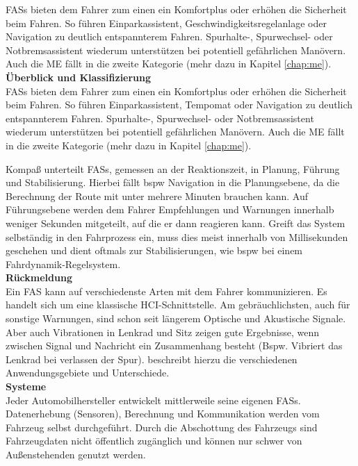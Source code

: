 {\acl{FASs} bieten dem Fahrer zum einen ein Komfortplus oder erhöhen die Sicherheit beim Fahren. So führen Einparkassistent,  Geschwindigkeitsregelanlage oder Navigation zu deutlich entspannterem Fahren. Spurhalte-, Spurwechsel- oder Notbremsassistent wiederum unterstützen bei potentiell gefährlichen Manövern. Auch die \acl{ME} fällt in die zweite Kategorie (mehr dazu in Kapitel \ref{chap:me}).\\

\textbf{Überblick und Klassifizierung} \\
\acl{FASs} bieten dem Fahrer zum einen ein Komfortplus oder erhöhen die Sicherheit beim Fahren. So führen Einparkassistent, Tempomat oder Navigation zu deutlich entspannterem Fahren. 
Spurhalte-, Spurwechsel- oder Notbremsassistent wiederum unterstützen bei potentiell gefährlichen Manövern. Auch die \acl{ME} fällt in die zweite Kategorie (mehr dazu in Kapitel \ref{chap:me}).

Kompaß \cite{fasFuture} unterteilt \acl{FASs}, gemessen an der Reaktionszeit, in Planung, Führung und Stabilisierung. Hierbei fällt \acl{bspw} Navigation in die Planungsebene, da die Berechnung der Route mit unter mehrere Minuten brauchen kann. Auf Führungsebene werden dem Fahrer Empfehlungen und Warnungen innerhalb weniger Sekunden mitgeteilt, auf die er dann reagieren kann. Greift das System selbständig in den Fahrprozess ein, muss dies meist innerhalb von Millisekunden geschehen und dient oftmals zur Stabilisierungen, wie \acl{bspw} bei einem Fahrdynamik-Regelsystem.\\

\textbf{Rückmeldung} \\
Ein \acl{FAS} kann auf verschiedenste Arten mit dem Fahrer kommunizieren. Es handelt sich um eine klassische HCI-Schnittstelle. Am gebräuchlichsten, auch für sonstige Warnungen, sind schon seit längerem Optische und Akustische Signale. Aber auch Vibrationen in Lenkrad und Sitz zeigen gute Ergebnisse, wenn zwischen Signal und Nachricht ein Zusammenhang besteht (Bspw. Vibriert das Lenkrad bei verlassen der Spur).
\cite{Bertoldi:2010:MAD:2002368.2002370} beschreibt hierzu die verschiedenen Anwendungsgebiete und Unterschiede. \\

\textbf{Systeme} \\
Jeder Automobilhersteller entwickelt mittlerweile seine eigenen \acl{FASs}. Datenerhebung (Sensoren), Berechnung und Kommunikation werden vom Fahrzeug selbst durchgeführt. Durch die Abschottung des Fahrzeugs sind Fahrzeugdaten nicht öffentlich zugänglich und können nur schwer von Außenstehenden genutzt werden. 

}
